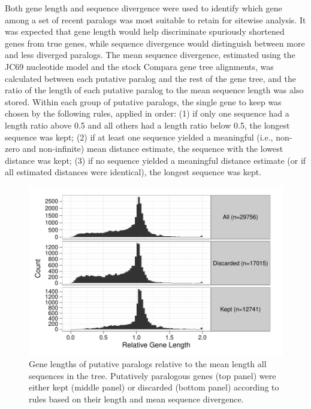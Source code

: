 Both gene length and sequence divergence were used to identify which
gene among a set of recent paralogs was most suitable to retain for
sitewise analysis. It was expected that gene length would help
discriminate spuriously shortened genes from true genes, while
sequence divergence would distinguish between more and less diverged
paralogs. The mean sequence divergence, estimated using the JC69
nucleotide model and the stock Compara gene tree alignments, was
calculated between each putative paralog and the rest of the gene
tree, and the ratio of the length of each putative paralog to the mean
sequence length was also stored. Within each group of putative
paralogs, the single gene to keep was chosen by the following rules,
applied in order: (1) if only one sequence had a length ratio above
0.5 and all others had a length ratio below 0.5, the longest sequence
was kept; (2) if at least one sequence yielded a meaningful (i.e.,
non-zero and non-infinite) mean distance estimate, the sequence with
the lowest distance was kept; (3) if no sequence yielded a meaningful
distance estimate (or if all estimated distances were identical), the
longest sequence was kept.

\begin{figure}[hb]
\centering
\includegraphics[scale=0.7]{Figs/filtered_paralogs_hist.pdf}
\caption{Gene lengths of putative paralogs relative to the mean length
  all sequences in the tree. Putatively paralogous genes (top panel)
  were either kept (middle panel) or discarded (bottom panel)
  according to rules based on their length and mean sequence
  divergence.}
\label{filtered_paralogs_hist}
\end{figure}

